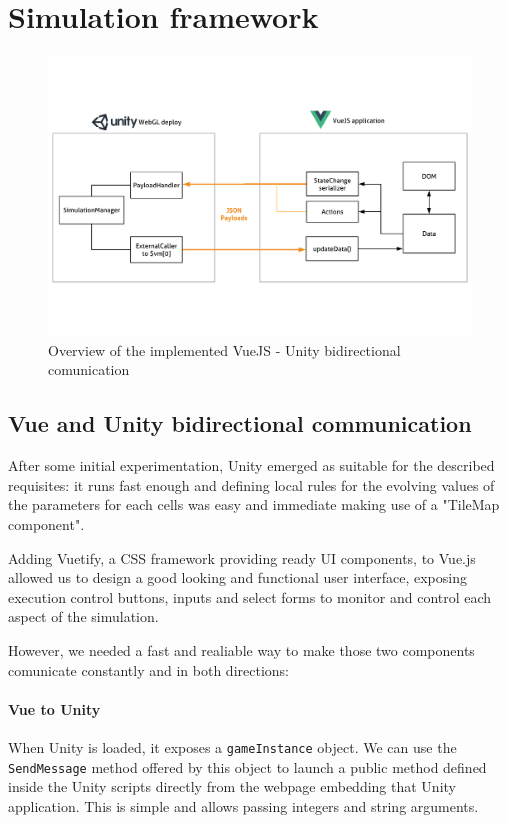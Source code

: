 \section{Simulation framework}
\begin{figure}
  \centering
    \includegraphics[width=1\textwidth]{sw_arch}%
    
  \caption{Overview of the implemented VueJS - Unity bidirectional comunication}
  \label{fig:swstack1}
\end{figure}
\subsection{Vue and Unity bidirectional communication}
After some initial experimentation, Unity emerged as suitable for the described requisites: it runs fast enough and defining local rules for the evolving values of the parameters for each cells was easy and immediate making use of a "TileMap component".

Adding Vuetify, a CSS framework providing ready UI components, to Vue.js allowed us to design a good looking and functional user interface, exposing execution control buttons, inputs and select forms to monitor and control each aspect of the simulation.

However, we needed a fast and realiable way to make those two components comunicate constantly and in both directions:

\paragraph{Vue to Unity}

When Unity is loaded, it exposes a \texttt{gameInstance} object. We can use the \texttt{SendMessage} method offered by this object to launch a public method defined inside the Unity scripts directly from the webpage embedding that Unity application. This is simple and allows passing integers and string arguments.

